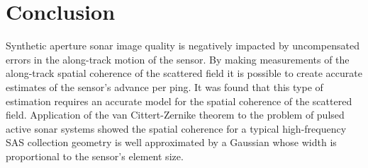 \documentclass[conference]{IEEEtran}
\begin{document}
%






\section{Conclusion}
Synthetic aperture sonar image quality is negatively impacted by uncompensated errors in the along-track motion of the sensor. By making measurements of the along-track spatial coherence of the scattered field it is possible to create accurate estimates of the sensor's advance per ping. It was found that this type of estimation requires an accurate model for the spatial coherence of the scattered field. Application of the van Cittert-Zernike theorem to the problem of pulsed active sonar systems showed the spatial coherence for a typical high-frequency SAS collection geometry is well approximated by a Gaussian whose width is proportional to the sensor's element size.
\end{document}
